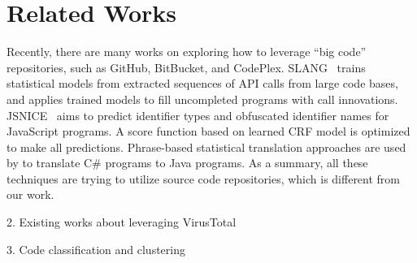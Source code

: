 \section{Related Works}
Recently, there are many works on exploring how to leverage ``big code'' repositories, 
such as GitHub, BitBucket, and CodePlex. 
SLANG~\cite{code-completion} trains statistical models from extracted sequences of API calls from large code bases, 
and applies trained models to fill uncompleted programs with call innovations. 
JSNICE~\cite{big-predicting} aims to predict identifier types and obfuscated identifier names for JavaScript programs. 
A score function based on learned CRF model is optimized to make all predictions. 
Phrase-based statistical translation approaches are used by \citet{big-translation} to translate C\# programs to Java programs. 
As a summary, all these techniques are trying to utilize source code repositories, which is different from our work. 

2. Existing works about leveraging VirusTotal

3. Code classification and clustering

